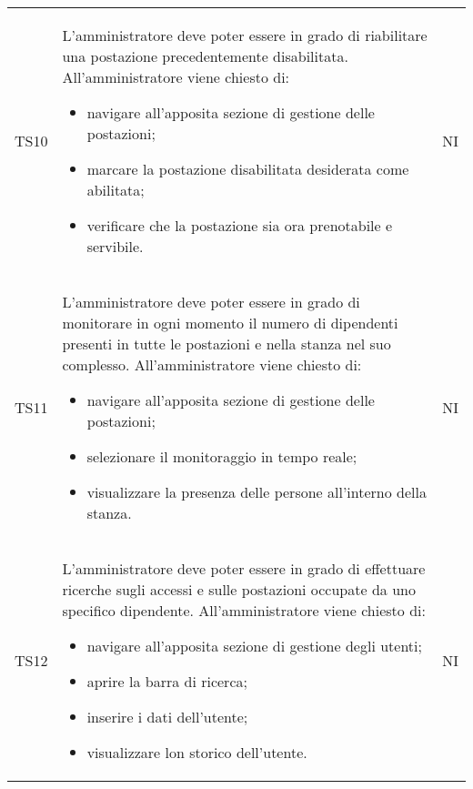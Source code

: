 {\begin{longtable}{ c C{11cm} c }
        TS10&
        \begin{flushleft}
            L'amministratore deve poter essere in grado di riabilitare una postazione precedentemente disabilitata.
            All'amministratore viene chiesto di:
        \end{flushleft}
        \begin{itemize}
            \item navigare all'apposita sezione di gestione delle postazioni;
            \item marcare la postazione disabilitata desiderata come abilitata;
            \item verificare che la postazione sia ora prenotabile e servibile.
        \end{itemize}&
        NI\\

        TS11&
        \begin{flushleft}
            L'amministratore deve poter essere in grado di monitorare in ogni momento il numero di dipendenti presenti in tutte le postazioni e nella stanza nel suo complesso.
            All'amministratore viene chiesto di:
        \end{flushleft}
        \begin{itemize}
            \item navigare all'apposita sezione di gestione delle postazioni;
            \item selezionare il monitoraggio in tempo reale;
            \item visualizzare la presenza delle persone all'interno della stanza.
        \end{itemize}&
        NI\\

        TS12&
        \begin{flushleft}
            L'amministratore deve poter essere in grado di effettuare ricerche sugli accessi e sulle postazioni occupate da uno specifico dipendente.
            All'amministratore viene chiesto di:
        \end{flushleft}
        \begin{itemize}
            \item navigare all'apposita sezione di gestione degli utenti;
            \item aprire la barra di ricerca;
            \item inserire i dati dell'utente;
            \item visualizzare lon storico dell'utente.
        \end{itemize}&
        NI\\


\end{longtable}}
